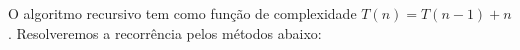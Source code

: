 O algoritmo recursivo tem como função de complexidade $T(n) = T(n - 1) + n$. Resolveremos a recorrência pelos métodos abaixo:


